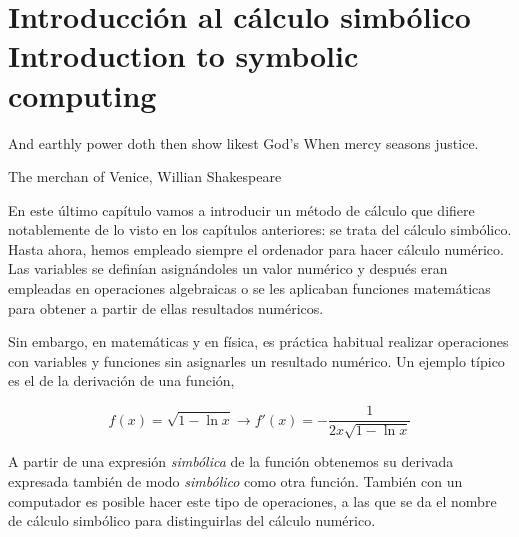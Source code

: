 \chapter{Introducción al cálculo simbólico\\Introduction to symbolic computing}
\epigraph{And earthly power doth then show likest God's
	When mercy seasons justice.}{The merchan of Venice, Willian Shakespeare}

\begin{paracol}{2}
En este último capítulo vamos a introducir un método de cálculo que difiere notablemente de lo visto  en los capítulos anteriores: se trata del cálculo simbólico. Hasta ahora, hemos empleado siempre el ordenador para hacer cálculo numérico. Las variables se definían asignándoles un valor numérico y después eran empleadas en operaciones algebraicas o se les aplicaban funciones matemáticas para obtener a partir de ellas resultados numéricos.

Sin embargo, en matemáticas y en física, es práctica habitual realizar operaciones con variables y funciones sin asignarles un resultado numérico. Un ejemplo típico es el de la derivación de una función,
\end{paracol}
\begin{equation*}
f(x) = \sqrt{1-\ln x} \rightarrow f'(x) =-\frac{1}{2x\sqrt{1 - \ln x}} 
\end{equation*}  
\begin{paracol}{2}
A partir de una expresión \emph{simbólica} de la función obtenemos su derivada expresada también de modo \emph{simbólico} como otra función. También con un computador es posible hacer este tipo de operaciones, a las que se da el nombre de cálculo simbólico para distinguirlas del cálculo numérico.  
\end{paracol}

